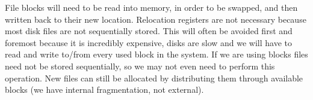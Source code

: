 \documentclass[12pt]{jhwhw}
\begin{document}
	\begin{addmargin}[1em]{}
		File blocks will need to be read into memory, in order to be swapped, and then
		written back to their new location. Relocation registers are not necessary
		because most disk files are not sequentially stored.
		This will often be avoided first and foremost because it is incredibly expensive,
		disks are slow and we will have to read and write to/from every used block in the system.
		If we are using blocks files need not be stored sequentially, so we may not even need
		to perform this operation. New files can still be allocated by distributing
		them through available blocks (we have internal fragmentation, not external).
	\end{addmargin}
\end{document}
